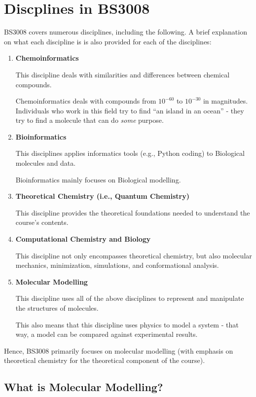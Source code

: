 \documentclass[
  letterpaper,
  DIV=11,
  numbers=noendperiod]{scrreprt}
\begin{document}
\hypertarget{discplines-in-bs3008}{%
\section{Discplines in BS3008}\label{discplines-in-bs3008}}

BS3008 covers numerous disciplines, including the following. A brief
explanation on what each discipline is is also provided for each of the
disciplines:

\begin{enumerate}
\def\labelenumi{\arabic{enumi}.}
\item
  \textbf{Chemoinformatics}

  This discipline deals with similarities and differences between
  chemical compounds.

  Chemoinformatics deals with compounds from \(10^{-60}\) to
  \(10^{-30}\) in magnitudes. Individuals who work in this field try to
  find ``an island in an ocean'' - they try to find a molecule that can
  do \emph{some} purpose.
\item
  \textbf{Bioinformatics}

  This disciplines applies informatics tools (e.g., Python coding) to
  Biological molecules and data.

  Bioinformatics mainly focuses on Biological modelling.
\item
  \textbf{Theoretical Chemistry (i.e., Quantum Chemistry)}

  This discipline provides the theoretical foundations needed to
  understand the course's contents.
\item
  \textbf{Computational Chemistry and Biology}

  This discipline not only encompasses theoretical chemistry, but also
  molecular mechanics, minimization, simulations, and conformational
  analysis.
\item
  \textbf{Molecular Modelling}

  This discipline uses all of the above disciplines to represent and
  manipulate the structures of molecules.

  This also means that this discipline uses physics to model a system -
  that way, a model can be compared against experimental results.
\end{enumerate}

Hence, BS3008 primarily focuses on molecular modelling (with emphasis on
theoretical chemistry for the theoretical component of the course).

\hypertarget{what-is-molecular-modelling}{%
\subsection{What is Molecular
Modelling?}\label{what-is-molecular-modelling}}
\end{document}

